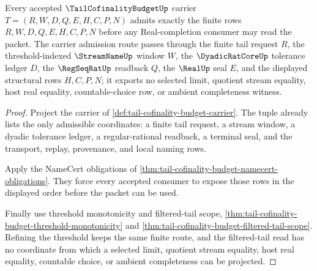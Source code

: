 \begin{theorem}
\label{thm:tail-cofinality-budget-obligation-carrier}
Every accepted $\TailCofinalityBudgetUp$ carrier $T=(R,W,D,Q,E,H,C,P,N)$ admits exactly the finite rows $R,W,D,Q,E,H,C,P,N$ before any Real-completion consumer may read the packet. The carrier admission route passes through the finite tail request $R$, the threshold-indexed $\StreamNameUp$ window $W$, the $\DyadicRatCoreUp$ tolerance ledger $D$, the $\RegSeqRatUp$ readback $Q$, the $\RealUp$ seal $E$, and the displayed structural rows $H,C,P,N$; it exports no selected limit, quotient stream equality, host real equality, countable-choice row, or ambient completeness witness.
\end{theorem}
\begin{proof}
Project the carrier of \autoref{def:tail-cofinality-budget-carrier}. The tuple already lists the only admissible coordinates: a finite tail request, a stream window, a dyadic tolerance ledger, a regular-rational readback, a terminal seal, and the transport, replay, provenance, and local naming rows.

Apply the NameCert obligations of \autoref{thm:tail-cofinality-budget-namecert-obligations}. They force every accepted consumer to expose those rows in the displayed order before the packet can be used.

Finally use threshold monotonicity and filtered-tail scope, \autoref{thm:tail-cofinality-budget-threshold-monotonicity} and \autoref{thm:tail-cofinality-budget-filtered-tail-scope}. Refining the threshold keeps the same finite route, and the filtered-tail read has no coordinate from which a selected limit, quotient stream equality, host real equality, countable choice, or ambient completeness can be projected.
\end{proof}

